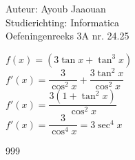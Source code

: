 \documentclass[a4paper]{article}
\begin{document}
\noindent \large Auteur: Ayoub Jaaouan \\
\noindent \large Studierichting: Informatica\\
\noindent \large Oefeningenreeks 3A nr. 24.25\\

\medskip

\normalsize

$f(x) = (3\tan x +\tan^3 x)$\\

$f'(x) = \dfrac{3}{\cos^2 x} + \dfrac{3 \tan^2 x}{\cos^2 x}$\\

$f'(x) = \dfrac{3(1+\tan^2x)}{\cos^2 x} $\\

$f'(x) = \dfrac{3}{\cos^4 x} = 3 \sec^4 x $\\







\begin{thebibliography}{999}
\end{thebibliography}
\end{document}
